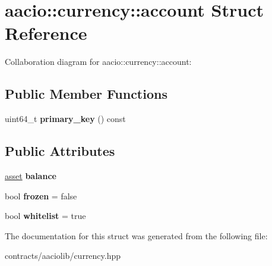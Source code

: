 \hypertarget{structaacio_1_1currency_1_1account}{}\section{aacio\+:\+:currency\+:\+:account Struct Reference}
\label{structaacio_1_1currency_1_1account}


Collaboration diagram for aacio\+:\+:currency\+:\+:account\+:
\subsection*{Public Member Functions}
\begin{DoxyCompactItemize}
\item 
\mbox{\label{structaacio_1_1currency_1_1account_a01fcee5748c7fe3b602a8e86809d2dac}} 
uint64\+\_\+t {\bfseries primary\+\_\+key} () const
\end{DoxyCompactItemize}
\subsection*{Public Attributes}
\begin{DoxyCompactItemize}
\item 
\mbox{\label{structaacio_1_1currency_1_1account_aed29eb6bf31f134aa941c7eb7668ccd2}} 
\mbox{\hyperlink{structaacio_1_1asset}{asset}} {\bfseries balance}
\item 
\mbox{\label{structaacio_1_1currency_1_1account_a0aa7b824081ca3136dddee8383aeccb5}} 
bool {\bfseries frozen} = false
\item 
\mbox{\label{structaacio_1_1currency_1_1account_a7e36fae1a27b6cccc5bae1b0b24fb04c}} 
bool {\bfseries whitelist} = true
\end{DoxyCompactItemize}


The documentation for this struct was generated from the following file\+:\begin{DoxyCompactItemize}
\item 
contracts/aaciolib/currency.\+hpp\end{DoxyCompactItemize}
